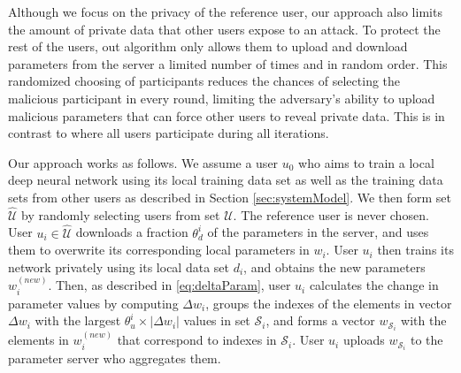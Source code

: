 \documentclass[letterpaper]{article}
\begin{document}
\begin{flushleft}
{Although we focus on the privacy of the reference user, our approach also
limits the amount of private data that other users expose to an attack. To protect the rest of the users, out algorithm only allows
them to upload and download parameters from the server a limited number of times and in random order. 
This randomized choosing of participants reduces the chances of selecting the malicious participant in every round, limiting
the adversary's ability to upload malicious parameters that can force other users to reveal private data. 
This is in contrast to \cite{shokri2015privacy} where all users participate during all iterations. 


Our approach works as follows. 
We assume a user $u_0$ who aims to train a local deep neural network using its local training data set as well as the training
data sets from other users as described in Section \ref{sec:systemModel}.  We then form set $\hat{\mathcal{{U}}}$ by randomly selecting
users from set $\mathcal{U}$. The reference user is never chosen.  
User $u_i\in\hat{\mathcal{U}}$ downloads a fraction $\theta_d^i$ of the parameters
in the server, and uses them to overwrite its  corresponding local parameters in $w_i$.
User $u_i$ then trains its network privately using its local data set  $d_i$, and obtains the new parameters $w_i^{(new)}$.
Then, as described in \eqref{eq:deltaParam}, user $u_i$ calculates the change in parameter values by computing $\Delta w_i$, groups the
indexes of the elements in vector $\Delta w_i$ with the largest $\theta_u^i\times |\Delta w_i|$ values in set $\mathcal{S}_i$, and 
forms a vector $w_{\mathcal{S}_i}$ with the elements in $w_i^{(new)}$ that correspond to indexes in $\mathcal{S}_i$. 
User $u_i$ uploads $w_{\mathcal{S}_i}$ to the parameter server who aggregates them. 

}
\end{flushleft}
\end{document}
